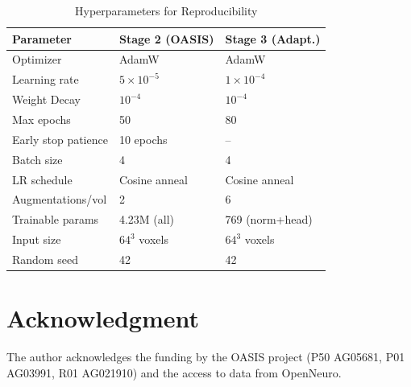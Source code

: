 \documentclass{ieeeaccess}
\begin{document}
\begin{table}[!h]
\caption{Hyperparameters for Reproducibility}
\label{tab:hyper}
\centering
\setlength{\tabcolsep}{4pt}
\begin{tabular}{lll}
\toprule
Parameter & Stage 2 (OASIS) & Stage 3 (Adapt.) \\
\midrule
Optimizer           & AdamW            & AdamW \\
Learning rate       & $5\times10^{-5}$ & $1\times10^{-4}$ \\
Weight Decay        & $10^{-4}$        & $10^{-4}$ \\
Max epochs          & 50               & 80 \\
Early stop patience & 10 epochs        & -- \\
Batch size          & 4                & 4 \\
LR schedule         & Cosine anneal    & Cosine anneal \\
Augmentations/vol   & 2                & 6 \\
Trainable params    & 4.23M (all)      & 769 (norm+head) \\
Input size          & $64^3$ voxels    & $64^3$ voxels \\
Random seed         & 42               & 42 \\
\bottomrule
\end{tabular}
\end{table}

\section*{Acknowledgment}

The author acknowledges the funding by the OASIS project
(P50 AG05681, P01 AG03991, R01 AG021910) and the access to data from
OpenNeuro.
\end{document}
